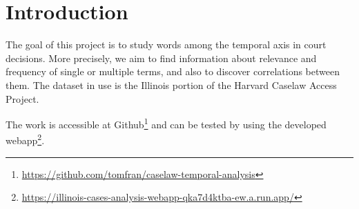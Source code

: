 \section{Introduction}

The goal of this project is to study words among the 
temporal axis in court decisions. 
More precisely, we aim to find information about relevance and 
frequency of single or multiple terms, and also to discover
correlations between them. 
The dataset in use is the Illinois portion of the Harvard Caselaw Access Project.

The work is accessible at Github\footnote{\url{https://github.com/tomfran/caselaw-temporal-analysis}} and can be
tested by using the developed webapp\footnote{\url{https://illinois-cases-analysis-webapp-qka7d4ktba-ew.a.run.app/}}.